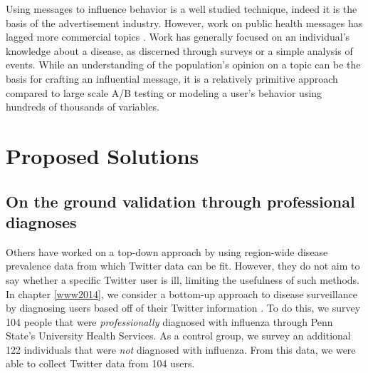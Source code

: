 Using messages to influence behavior is a well studied technique,\cite{Eyssartier:2008jy,CavalliSforza:1982we,Rendell:2010go,Traulsen:2010ja,Centola:2010ki,Bond:2012ff} indeed it is the basis of the advertisement industry. However, work on public health messages has lagged more commercial topics \cite{timimi2013shape}. Work has generally focused on an individual's knowledge about a disease, as discerned through surveys\cite{Jones:2009cv} or a simple analysis of events\cite{Kinsman:2012wi}. While an understanding of the population's opinion on a topic can be the basis for crafting an influential message, it is a relatively primitive approach compared to large scale A/B testing \cite{bakshy2014www} or modeling a user's behavior using hundreds of thousands of variables. \cite{mcmahan2013ad}

\section{Proposed Solutions}
\subsection{On the ground validation through professional diagnoses}
\label{subsec:intro_uhs}
Others have worked on a top-down approach by using region-wide disease prevalence data from which Twitter data can be fit. \cite{gft,culotta2010towards,culotta2013lightweight,signorini2011use} However, they do not aim to say whether a specific Twitter user is ill, limiting the usefulness of such methods. In chapter \ref{www2014}, we consider a bottom-up approach to disease surveillance by diagnosing users based off of their Twitter information \cite{www2014}. To do this, we survey 104 people that were \emph{professionally} diagnosed with influenza through Penn State's University Health Services. As a control group, we survey an additional 122 individuals that were \emph{not} diagnosed with influenza. From this data, we were able to collect Twitter data from 104 users.



